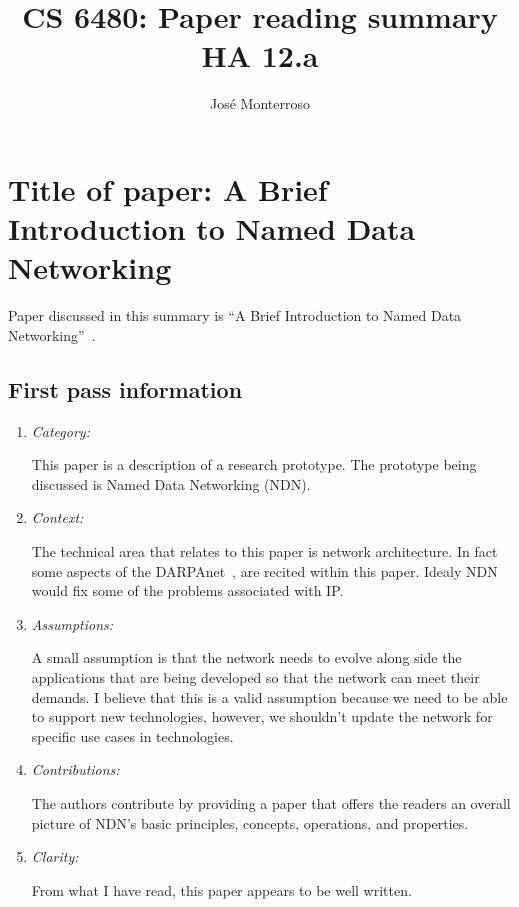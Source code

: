 \documentclass[letterpaper,twocolumn,10pt]{article}
\title{CS 6480: Paper reading summary\\
HA 12.a\\}
\author{José Monterroso}
\affil{School of Computing, University of Utah}
\begin{document}
\maketitle
\section{Title of paper: A Brief Introduction to Named Data Networking}

Paper discussed in this summary is ``A Brief Introduction to Named Data Networking''~\cite{ndn}.

\subsection{First pass information}
\label{sec:first}

\begin{enumerate}

\item {\it Category:} 

This paper is a description of a research prototype. The prototype being discussed is Named Data Networking (NDN). 

\item {\it Context:} 

The technical area that relates to this paper is network architecture. In fact some aspects of the DARPAnet~\cite{darpa},
are recited within this paper. Idealy NDN would fix some of the problems associated with IP.

\item {\it Assumptions:}  

A small assumption is that the network needs to evolve along side the applications that are being developed so that 
the network can meet their demands. I believe that this is a valid assumption because we need to be able to support 
new technologies, however, we shouldn't update the network for specific use cases in technologies. 

\item {\it Contributions:} 

The authors contribute by providing a paper that offers the readers an overall picture of NDN's basic principles, concepts,
operations, and properties. 

\item {\it Clarity:} 

From what I have read, this paper appears to be well written.

\end{enumerate}
\end{document}
